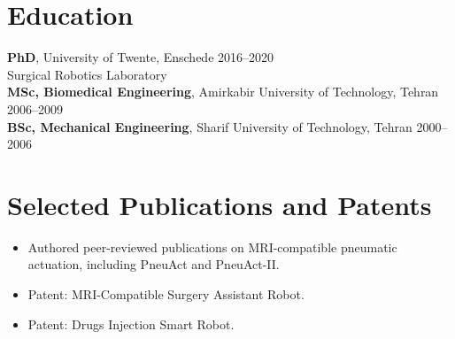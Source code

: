 \documentclass[11pt,a4paper]{article}
\begin{document}
\section{Education}
\textbf{PhD}, University of Twente, Enschede \hfill 2016--2020 \\
{\small Surgical Robotics Laboratory } \\[2pt]
\textbf{MSc, Biomedical Engineering}, Amirkabir University of Technology, Tehran \hfill 2006--2009 \\
\textbf{BSc, Mechanical Engineering}, Sharif University of Technology, Tehran \hfill 2000--2006

\section{Selected Publications and Patents}
\begin{itemize}
 \item Authored peer-reviewed publications on MRI-compatible pneumatic actuation, including PneuAct and PneuAct-II.
 \item Patent: MRI-Compatible Surgery Assistant Robot.
 \item Patent: Drugs Injection Smart Robot.
\end{itemize}
\end{document}
